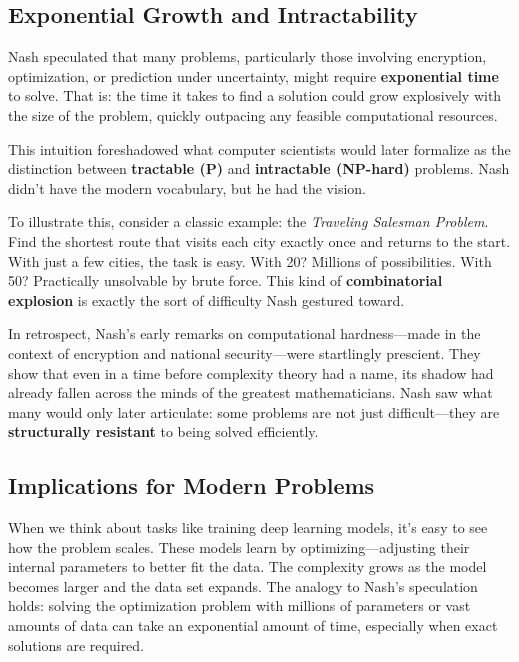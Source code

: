 \subsection{Exponential Growth and Intractability}

Nash speculated that many problems, particularly those involving encryption, optimization, or prediction under uncertainty, might require \textbf{exponential time} to solve. That is: the time it takes to find a solution could grow explosively with the size of the problem, quickly outpacing any feasible computational resources.

This intuition foreshadowed what computer scientists would later formalize as the distinction between \textbf{tractable (P)} and \textbf{intractable (NP-hard)} problems. Nash didn’t have the modern vocabulary, but he had the vision.

To illustrate this, consider a classic example: the \textit{Traveling Salesman Problem}. Find the shortest route that visits each city exactly once and returns to the start. With just a few cities, the task is easy. With 20? Millions of possibilities. With 50? Practically unsolvable by brute force. This kind of \textbf{combinatorial explosion} is exactly the sort of difficulty Nash gestured toward.

\medskip

In retrospect, Nash’s early remarks on computational hardness—made in the context of encryption and national security—were startlingly prescient. They show that even in a time before complexity theory had a name, its shadow had already fallen across the minds of the greatest mathematicians. Nash saw what many would only later articulate: some problems are not just difficult—they are \textbf{structurally resistant} to being solved efficiently.


\subsection{Implications for Modern Problems}

When we think about tasks like training deep learning models, it’s easy to see how the problem scales. These models learn by optimizing—adjusting their internal parameters to better fit the data. The complexity grows as the model becomes larger and the data set expands. The analogy to Nash’s speculation holds: solving the optimization problem with millions of parameters or vast amounts of data can take an exponential amount of time, especially when exact solutions are required.

